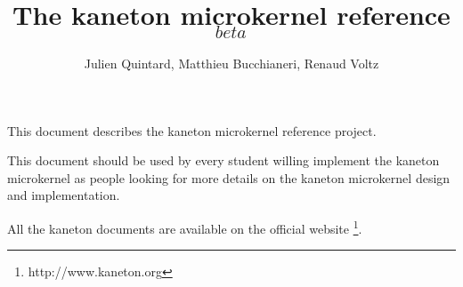 
%
%



%
%

\rhead{}

%
%

\title{The kaneton microkernel reference $_{beta}$
       \logos}

%
%

\author{\small{Julien Quintard},
        \small{Matthieu Bucchianeri},
        \small{Renaud Voltz}}

%
%



%
%

\maketitle

%
%

%
%

This document describes the kaneton microkernel reference project.

This document should be used by every student willing implement the
kaneton microkernel as people looking for more details on the kaneton
microkernel design and implementation.

All the kaneton documents are available on
the official website
  \footnote{http://www.kaneton.org}.

%
%

\tableofcontents

%
%











%

%
%



